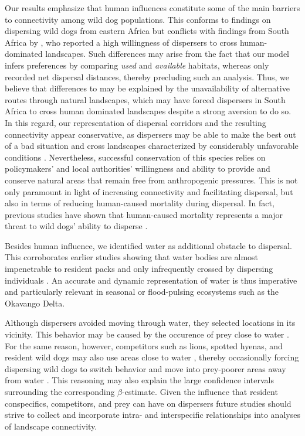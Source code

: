 \documentclass[abstract=on,10pt,a4paper,bibliography=totocnumbered]{article}
\begin{document}
Our results emphasize that human influences constitute some of the main barriers
to connectivity among wild dog populations. This conforms to findings on
dispersing wild dogs from eastern Africa \citep{Masenga.2016, Oneill.2020} but
conflicts with findings from South Africa by \cite{DaviesMostert.2012}, who
reported a high willingness of dispersers to cross human-dominated landscapes.
Such differences may arise from the fact that our model infers preferences by
comparing \textit{used} and \textit{available} habitats, whereas
\cite{DaviesMostert.2012} only recorded net dispersal distances, thereby
precluding such an analysis. Thus, we believe that differences to
\cite{DaviesMostert.2012} may be explained by the unavailability of alternative
routes through natural landscapes, which may have forced dispersers in South
Africa to cross human dominated landscapes despite a strong aversion to do so.
In this regard, our representation of dispersal corridors and the resulting
connectivity appear conservative, as dispersers may be able to make the best out
of a bad situation and cross landscapes characterized by considerably
unfavorable conditions \citep{Palomares.2000, Elliot.2014}. Nevertheless,
successful conservation of this species relies on policymakers' and local
authorities' willingness and ability to provide and conserve natural areas that
remain free from anthropogenic pressures. This is not only paramount in light of
increasing connectivity and facilitating dispersal, but also in terms of
reducing human-caused mortality during dispersal. In fact, previous studies have
shown that human-caused mortality represents a major threat to wild dogs'
ability to disperse \citep{Woodroffe.2019, Cozzi.2020}.

Besides human influence, we identified water as additional obstacle to
dispersal. This corroborates earlier studies showing that water bodies are
almost impenetrable to resident packs \citep{Abrahms.2017} and only infrequently
crossed by dispersing individuals \citep{Cozzi.2020}. An accurate and dynamic
representation of water is thus imperative and particularly relevant in seasonal
or flood-pulsing ecosystems such as the Okavango Delta.

Although dispersers avoided moving through water, they selected locations in its
vicinity. This behavior may be caused by the occurence of prey close to water
\citep{Bonyongo.2005}. For the same reason, however, competitors such as lions,
spotted hyenas, and resident wild dogs may also use areas close to water
\citep{Valeix.2010}, thereby occasionally forcing dispersing wild dogs to switch
behavior and move into prey-poorer areas away from water \citep{Creel.2002,
Mills.1997}. This reasoning may also explain the large confidence intervals
surrounding the corresponding \(\beta\)-estimate. Given the influence that
resident conspecifics, competitors, and prey can have on dispersers
\citep{Cozzi.2018, Armansin.2019} future studies should strive to collect and
incorporate intra- and interspecific relationships into analyses of landscape
connectivity.
\end{document}
